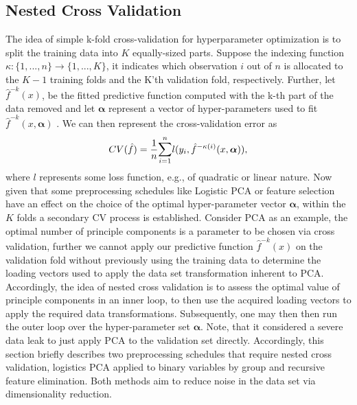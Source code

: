 \documentclass[a4paper,12pt, headsepline]{scrartcl}
\numberwithin{equation}{section}
\begin{document}
\subsection{Nested Cross Validation}\label{subsec:nest}
The idea of simple k-fold cross-validation for hyperparameter optimization is to split the training data into $K$ equally-sized parts. Suppose the indexing function $\kappa: \{1, ..., n\} \rightarrow \{1, ..., K\}$, it indicates which observation $i$ out of $n$ is allocated to the $K - 1$ training folds and the K'th validation fold, respectively. Further, let $\hat f^{-k}(x)$, be the fitted predictive function computed with the k-th part of the data removed and let $\bm \alpha$ represent a vector of hyper-parameters used to fit $\hat f^{-k}(x, \bm{\alpha})$ \citep{hastie09}. We can then represent the cross-validation error as
\begin{gather*}
	CV(\hat f) = \frac{1}{n} \mathlarger{\sum}\limits_{i = 1}^{n} l(y_i, \hat f^{-\kappa(i)}(x, \bm \alpha)),
\end{gather*}
where $l$ represents some loss function, e.g., of quadratic or linear nature.
Now given that some preprocessing schedules like Logistic PCA or feature selection have an effect on the choice of the optimal hyper-parameter vector $\bm \alpha$, within the $K$ folds a secondary CV process is established. Consider PCA as an example, the optimal number of principle components is a parameter to be chosen via cross validation, further we cannot apply our predictive function $\hat f^{-k}(x)$ on the validation fold without previously using the training data to determine the loading vectors used to apply the data set transformation inherent to PCA. Accordingly, the idea of nested cross validation is to assess the optimal value of principle components in an inner loop, to then use the acquired loading vectors to apply the required data transformations. Subsequently, one may then then run the outer loop over the hyper-parameter set $\bm \alpha$. Note, that it considered a severe data leak to just apply PCA to the validation set directly. Accordingly, this section briefly describes two preprocessing schedules that require nested cross validation, logistics PCA applied to binary variables by group and recursive feature elimination. Both methods aim to reduce noise in the data set via dimensionality reduction.
\end{document}
